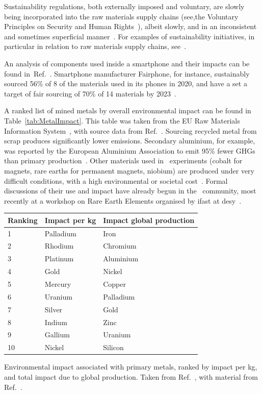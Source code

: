 \documentclass[../SustainableHEP.tex]{subfiles}
\begin{document}
Sustainability regulations, both externally imposed and voluntary, are slowly being incorporated into the raw materials supply chains (see,\eg the Voluntary Principles on Security and Human Rights~\cite{VoluntaryPrinciples}), albeit slowly, and in an inconsistent and sometimes superficial manner~\cite{ResponsibleMiningIndex,ResponsibleMiningFoundation}.  For examples of sustainability initiatives, in particular in relation to raw materials supply chains, see~.

An analysis of components used inside a smartphone and their impacts can be found in~Ref.~\cite{fairphone}.  Smartphone manufacturer Fairphone, for instance, sustainably sourced 56\% of 8 of the materials used in its phones in 2020, and have a set a target of fair sourcing of 70\% of 14 materials by 2023~\cite{fairphone2}. 

A ranked list of mined metals by overall environmental impact can be found in Table~\ref{tab:MetalImpact}.  This table was taken from the EU Raw Materials Information System~\cite{EURMIS}, with source data from Ref.~\cite{UNEP2010}.  Sourcing recycled metal from scrap produces significantly lower emissions.  Secondary aluminium, for example, was reported by the European Aluminium Association to emit 95\% fewer GHGs than primary production~\cite{EURaw}. Other materials used in \ACR\ experiments (\eg cobalt for magnets, rare earths for permanent magnets, niobium) are produced under very difficult conditions, with a high environmental or societal cost~\cite{FARJANA2019150, EURare, ALVES2019275}.  Formal discussions of their use and impact have already begun in the \ACR\ community, most recently at a workshop on Rare Earth Elements organised by \acrshort{ifast} at \acrshort{desy}~\cite{DESYRareEarth}.

\bigskip
{\centering
{}
\captionsetup{type=table}
\begin{tabular}{@{}lll@{}}\toprule
Ranking& Impact per kg & 
Impact global production \\ 
\midrule
1 & Palladium & Iron \\
2 & Rhodium & Chromium \\
3 & Platinum & Aluminium \\
4 & Gold & Nickel \\
5 & Mercury & Copper \\
6 & Uranium & Palladium \\
7 & Silver & Gold \\
8& Indium & Zinc \\
9 & Gallium & Uranium \\
10 & Nickel & Silicon \\

\bottomrule
\end{tabular}
\caption[Environmental impact associated with primary metals]{Environmental impact associated with primary metals, ranked by impact per kg, and total impact due to global production.  Taken from Ref.~\cite{EURMIS}, with material from Ref.~\cite{UNEP2010}.}
\label{tab:MetalImpact}
}
\end{document}
